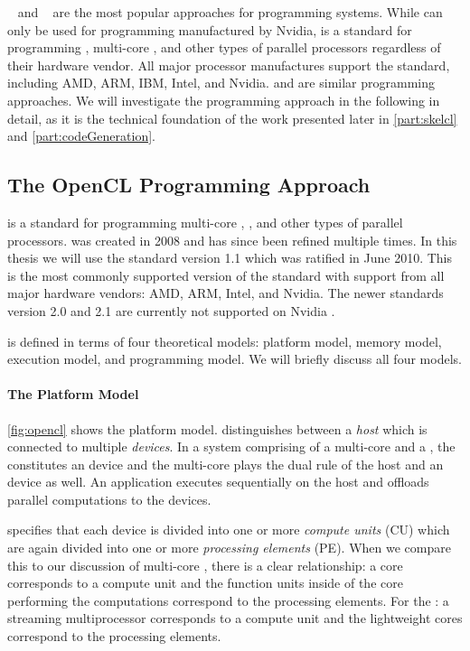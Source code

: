 \CUDA~\cite{CUDAProgrammingGuide} and \OpenCL~\cite{OpenCL} are the most popular approaches for programming \GPU systems.
While \CUDA can only be used for programming \GPUs manufactured by Nvidia, \OpenCL is a standard for programming \GPUs, multi-core \CPUs, and other types of parallel processors regardless of their hardware vendor.
All major processor manufactures support the \OpenCL standard, including AMD, ARM, IBM, Intel, and Nvidia.
\CUDA and \OpenCL are similar programming approaches.
We will investigate the \OpenCL programming approach in the following in detail, as it is the technical foundation of the work presented later in \autoref{part:skelcl} and \autoref{part:codeGeneration}.


\subsection{The OpenCL Programming Approach}
\OpenCL is a standard for programming multi-core \CPUs, \GPUs, and other types of parallel processors.
\OpenCL was created in 2008 and has since been refined multiple times.
In this thesis we will use the \OpenCL standard version 1.1 which was ratified in June 2010.
This is the most commonly supported version of the standard with support from all major hardware vendors: AMD, ARM, Intel, and Nvidia.
The newer \OpenCL standards version 2.0 and 2.1 are currently not supported on Nvidia \GPUs.

\OpenCL is defined in terms of four theoretical models: platform model, memory model, execution model, and programming model.
We will briefly discuss all four models.

\paragraph{The \OpenCL Platform Model}
\autoref{fig:opencl} shows the \OpenCL platform model.
\OpenCL distinguishes between a \emph{host} which is connected to multiple \OpenCL \emph{devices}.
In a system comprising of a multi-core \CPU and a \GPU, the \GPU constitutes an \OpenCL device and the multi-core \CPU plays the dual rule of the host and an \OpenCL device as well.
An \OpenCL application executes sequentially on the host and offloads parallel computations to the \OpenCL devices.

\OpenCL specifies that each device is divided into one or more \emph{compute units} (CU) which are again divided into one or more \emph{processing elements} (PE).
When we compare this to our discussion of multi-core \CPUs, there is a clear relationship:
a \CPU core corresponds to a compute unit and the function units inside of the \CPU core performing the computations correspond to the processing elements.
For the \GPU: a streaming multiprocessor corresponds to a compute unit and the lightweight \GPU cores correspond to the processing elements.

